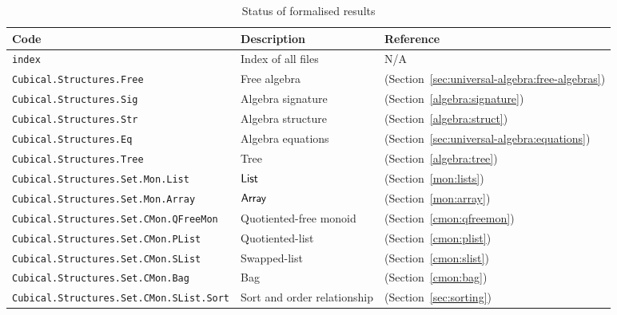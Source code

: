 \begin{toappendix}
\begin{table}[h]\label{appendix:formalizations}
\centering
\begin{tabular}{lll}
\hline
\textbf{Code} & \textbf{Description} & \textbf{Reference}               \\ \hline
\texttt{index} & Index of all files & N/A \\
\texttt{Cubical.Structures.Free}         & Free algebra            & (Section~\cref{sec:universal-algebra:free-algebras}) \\
\texttt{Cubical.Structures.Sig}         & Algebra signature            & (Section~\cref{algebra:signature}) \\
\texttt{Cubical.Structures.Str}         & Algebra structure            & (Section~\cref{algebra:struct}) \\
\texttt{Cubical.Structures.Eq}         & Algebra equations            & (Section~\cref{sec:universal-algebra:equations}) \\
\texttt{Cubical.Structures.Tree}         & Tree     & (Section~\cref{algebra:tree}) \\
\texttt{Cubical.Structures.Set.Mon.List} & $\operatorname{\mathsf{List}}$  & (Section~\cref{mon:lists}) \\
\texttt{Cubical.Structures.Set.Mon.Array} & $\operatorname{\mathsf{Array}}$  & (Section~\cref{mon:array})\\
\texttt{Cubical.Structures.Set.CMon.QFreeMon} & Quotiented-free monoid & (Section~\cref{cmon:qfreemon}) \\
\texttt{Cubical.Structures.Set.CMon.PList} & Quotiented-list & (Section~\cref{cmon:plist}) \\
\texttt{Cubical.Structures.Set.CMon.SList} & Swapped-list & (Section~\cref{cmon:slist}) \\
\texttt{Cubical.Structures.Set.CMon.Bag} & Bag & (Section~\cref{cmon:bag}) \\
\texttt{Cubical.Structures.Set.CMon.SList.Sort} & Sort and order relationship & (Section~\cref{sec:sorting}) \\
\hline
\end{tabular}
\caption{Status of formalised results}
\label{tab:formalised_results}
\end{table}
\end{toappendix}
